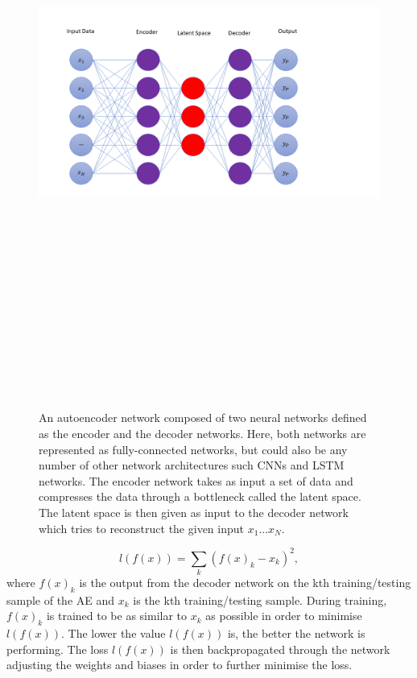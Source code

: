 \begin{figure}
    \centering
    \includegraphics[width=19cm,height=20cm,keepaspectratio]{figures/autoencoder_diagram.png}
    \caption[Simple autoencoder network illustration.]{An autoencoder network composed of two neural networks defined as the encoder 
    and the decoder networks. Here, both networks are represented as fully-connected networks, but could also be any number of other network architectures such \ac{CNN}s and \ac{LSTM} networks. The encoder network takes as input a set of data and compresses the data  
    through a bottleneck called the latent space. The latent space is then given as input to the decoder network which tries to reconstruct the given input $x_1 ... x_N$.}
    \label{fig:autoencoder_diagram}
\end{figure}
\begin{equation}
    l(f(x)) = \sum_k{(f(x)_k - x_k)^2},
\end{equation}
where $f(x)_k$ is the output from the decoder network on the 
kth training/testing sample of the \ac{AE} and $x_k$ is the 
kth training/testing sample. During training, $f(x)_k$ is trained 
to be as similar to $x_k$ as possible in order to minimise 
$l(f(x))$. The lower the value $l(f(x))$ is, the better the network 
is performing. The loss $l(f(x))$ is then backpropagated through 
the network adjusting the weights and biases in order to  
further minimise the loss.

